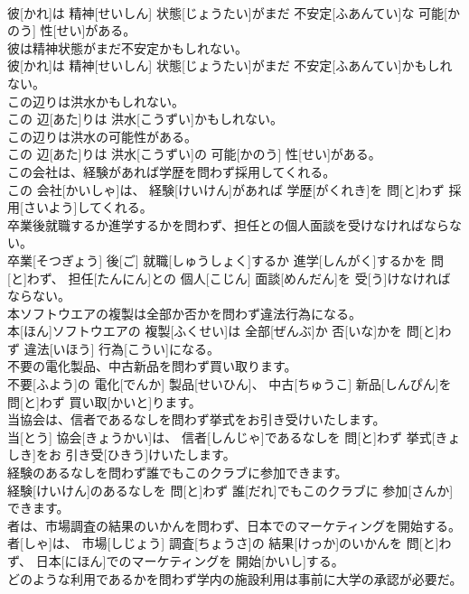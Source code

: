 \documentclass[8pt]{extreport}
\begin{document}
\begin{CJK}{UTF8}{min}
\\	彼[かれ]は 精神[せいしん] 状態[じょうたい]がまだ 不安定[ふあんてい]な 可能[かのう] 性[せい]がある。
\\	彼は精神状態がまだ不安定かもしれない。	
\\	彼[かれ]は 精神[せいしん] 状態[じょうたい]がまだ 不安定[ふあんてい]かもしれない。
\\	この辺りは洪水かもしれない。	
\\	この 辺[あた]りは 洪水[こうずい]かもしれない。
\\	この辺りは洪水の可能性がある。	
\\	この 辺[あた]りは 洪水[こうずい]の 可能[かのう] 性[せい]がある。
\\	この会社は、経験があれば学歴を問わず採用してくれる。	
\\	この 会社[かいしゃ]は、 経験[けいけん]があれば 学歴[がくれき]を 問[と]わず 採用[さいよう]してくれる。
\\	卒業後就職するか進学するかを問わず、担任との個人面談を受けなければならない。	
\\	卒業[そつぎょう] 後[ご] 就職[しゅうしょく]するか 進学[しんがく]するかを 問[と]わず、 担任[たんにん]との 個人[こじん] 面談[めんだん]を 受[う]けなければならない。
\\	本ソフトウエアの複製は全部か否かを問わず違法行為になる。	
\\	本[ほん]ソフトウエアの 複製[ふくせい]は 全部[ぜんぶ]か 否[いな]かを 問[と]わず 違法[いほう] 行為[こうい]になる。
\\	不要の電化製品、中古新品を問わず買い取ります。	
\\	不要[ふよう]の 電化[でんか] 製品[せいひん]、 中古[ちゅうこ] 新品[しんぴん]を 問[と]わず 買い取[かいと]ります。
\\	当協会は、信者であるなしを問わず挙式をお引き受けいたします。	
\\	当[とう] 協会[きょうかい]は、 信者[しんじゃ]であるなしを 問[と]わず 挙式[きょしき]をお 引き受[ひきう]けいたします。
\\	経験のあるなしを問わず誰でもこのクラブに参加できます。	
\\	経験[けいけん]のあるなしを 問[と]わず 誰[だれ]でもこのクラブに 参加[さんか]できます。
\\	者は、市場調査の結果のいかんを問わず、日本でのマーケティングを開始する。	
\\	者[しゃ]は、 市場[しじょう] 調査[ちょうさ]の 結果[けっか]のいかんを 問[と]わず、 日本[にほん]でのマーケティングを 開始[かいし]する。
\\	どのような利用であるかを問わず学内の施設利用は事前に大学の承認が必要だ。	

\end{CJK}
\end{document}
